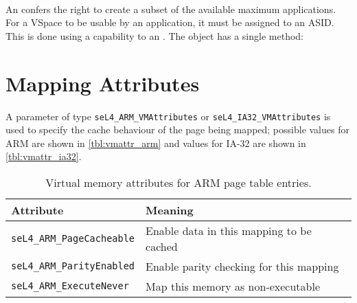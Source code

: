 \paragraph{}

An  confers the right to create a subset of the available
maximum applications. For a VSpace to be usable by an application, it
must be assigned to an ASID. This is done using a capability to an
. The  object has a single method:
\vspace{2ex}\\

\section{Mapping Attributes}
A parameter of type \texttt{seL4\_ARM\_VMAttributes} or
\texttt{seL4\_IA32\_VMAttributes} is used to specify the cache behaviour of the
page being mapped; possible values for ARM are shown in \autoref{tbl:vmattr_arm} \ifxeightsix and values for IA-32 are shown in \autoref{tbl:vmattr_ia32}\fi.

\begin{table}[htb]
  \begin{center}
    \begin{tabularx}{\textwidth}{p{}X}
      \toprule
      Attribute & Meaning \\
      \midrule
      \texttt{seL4\_ARM\_PageCacheable} & Enable data in this mapping
      to be cached \\
      \texttt{seL4\_ARM\_ParityEnabled} & Enable parity checking for
      this mapping\\
      \texttt{seL4\_ARM\_ExecuteNever} & Map this memory as non-executable \\
      \bottomrule
    \end{tabularx}
    \caption{\label{tbl:vmattr_arm} Virtual memory attributes for ARM page
      table entries.}
  \end{center}
\end{table}

